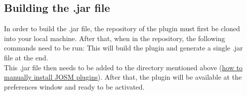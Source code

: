 \subsection{Building the .jar file}
In order to build the .jar file, the repository of the plugin must first be cloned into your local machine. After that, when in the repository, the following commands need to be run:
This will build the plugin and generate a single .jar file at the end.\\
This .jar file then needs to be added to the directory mentioned above (\hyperref[par:ManuallyInstall]{how to manually install JOSM plugins}). After that, the plugin will be available at the preferences window and ready to be activated.
